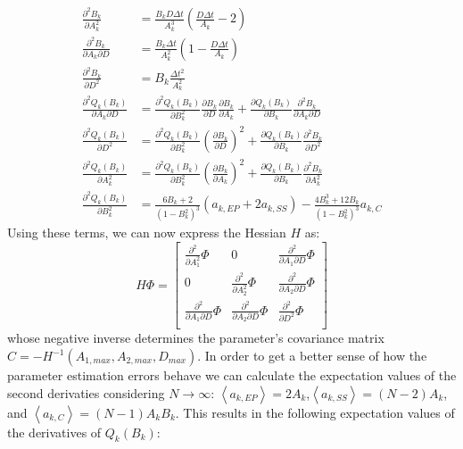 \documentclass[%
 reprint,
 amsmath,amssymb,
 aps,
]{revtex4-1}
\begin{document}
\begin{equation}
	\begin{aligned}
		\frac{\partial^{2} B_{k}}{\partial A_{k}^{2}} &=\frac{B_{k}D\Delta t}{A_{k}^{3}}\left(\frac{D\Delta t}{A_{k}}-2\right) \\
		\frac{\partial^{2} B_{k}}{\partial A_{k}\partial D} & = \frac{B_{k}\Delta t}{A_{k}^{2}}\left(1-\frac{D\Delta t}{A_{k}}\right)\\
		\frac{\partial^{2} B_{k}}{\partial D^{2}} &= B_{k}\frac{\Delta t^{2}}{A_{k}^{2}}\\
		\frac{\partial^{2} Q_{k}(B_{k})}{\partial A_{k}\partial D} &= 
		\frac{\partial^{2} Q_{k}(B_{k})}{\partial B_{k}^{2}}\frac{\partial B_{k}}{\partial D}\frac{\partial B_{k}}{\partial A_{k}}
		+\frac{\partial Q_{k}(B_{k})}{\partial B_{k}}\frac{\partial^{2} B_{k}}{\partial A_{k}\partial D}\\
		\frac{\partial^{2}Q_{k}(B_{k})}{\partial D^{2}} &= \frac{\partial^{2}Q_{k}(B_{k})}{\partial B_{k}^{2}}\left(\frac{\partial B_{k}}{\partial D}\right)^{2}
		+\frac{\partial Q_{k}(B_{k})}{\partial B_{k}}\frac{\partial^{2}B_{k}}{\partial D^{2}}\\
		\frac{\partial^{2}Q_{k}(B_{k})}{\partial A_{k}^{2}} &= 
		\frac{\partial^{2}Q_{k}(B_{k})}{\partial B_{k}^{2}}\left(\frac{\partial B_{k}}{\partial A_{k}}\right)^{2}
		+\frac{\partial Q_{k}(B_{k})}{\partial B_{k}}\frac{\partial^{2}B_{k}}{\partial A_{k}^{2}}\\
		\frac{\partial^{2}Q_{k}(B_{k})}{\partial B_{k}^{2}} &= \frac{6B_{k}+2}{(1-B_{k}^{2})^{3}}\left(a_{k,EP}+2a_{k,SS}\right)
		-\frac{4B_{k}^{3}+12B_{k}}{(1-B_{k}^{2})^{3}}a_{k,C}
	\end{aligned}
\end{equation}
Using these terms, we can now express the Hessian $H$ as:
\begin{equation}H\Phi=
\begin{bmatrix} 
\frac{\partial^{2}}{\partial A_{1}^2}\Phi & 0 & \frac{\partial^{2}}{\partial A_{1}\partial D}\Phi \\
0 & \frac{\partial^{2}}{\partial A_{2}^2}\Phi & \frac{\partial^{2}}{\partial A_{2}\partial D}\Phi \\
\frac{\partial^{2}}{\partial A_{1}\partial D}\Phi & \frac{\partial^{2}}{\partial A_{2}\partial D}\Phi & \frac{\partial^{2}}{\partial D^2}\Phi\\
\end{bmatrix}
\end{equation}
whose negative inverse determines the parameter's covariance matrix $C = -H^{-1}(A_{1,max},A_{2,max},D_{max})$. In order to get a better sense of how the parameter estimation errors behave we can calculate the expectation values of the second derivaties considering $N\rightarrow \infty$: $\left\langle a_{k,EP} \right\rangle=2A_{k}$,$\left\langle a_{k,SS} \right\rangle=(N-2)A_{k}$, and $\left\langle a_{k,C} \right\rangle=(N-1)A_{k}B_{k}$.  This results in the following expectation values of the derivatives of $Q_{k}(B_{k})$:
\end{document}
